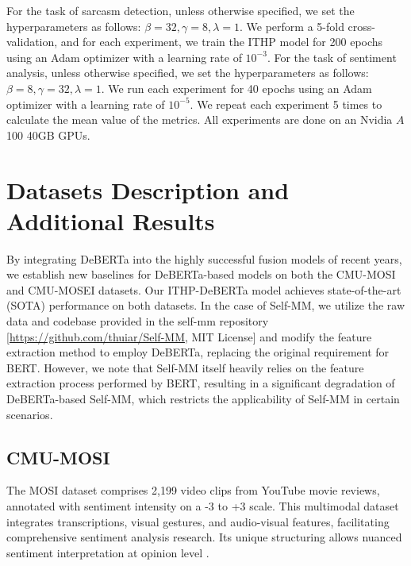 \documentclass{article} %
\begin{document}
For the task of sarcasm detection, unless otherwise specified, we set the  hyperparameters as follows: $\beta=32, \gamma=8, \lambda=1$. We perform a 5-fold cross-validation, and for each experiment, we train the ITHP model for 200 epochs using an Adam optimizer with a learning rate of $10^{-3}$. For the task of sentiment analysis, unless otherwise specified, we set the  hyperparameters as follows: $\beta=8, \gamma=32, \lambda=1$. We run each experiment for 40 epochs using an Adam optimizer with a learning rate of $10^{-5}$. We repeat each experiment 5 times to calculate the mean value of the metrics. All experiments are done on an Nvidia $A$100 40GB GPUs.


\section{Datasets Description and Additional Results}
\label{apsec:AdditionalRes}

By integrating DeBERTa into the highly successful fusion models of recent years, we establish new baselines for DeBERTa-based models on both the CMU-MOSI and CMU-MOSEI datasets. Our ITHP-DeBERTa model achieves state-of-the-art (SOTA) performance on both datasets. In the case of Self-MM, we utilize the raw data and codebase provided in the self-mm repository [\href{https://github.com/thuiar/Self-MM}{https://github.com/thuiar/Self-MM}, MIT License] and modify the feature extraction method to employ DeBERTa, replacing the original requirement for BERT. However, we note that Self-MM itself heavily relies on the feature extraction process performed by BERT, resulting in a significant degradation of DeBERTa-based Self-MM, which restricts the applicability of Self-MM in certain scenarios.



\subsection{CMU-MOSI}
\label{apsec: MOSI1}

The MOSI dataset comprises 2,199 video clips from YouTube movie reviews, annotated with sentiment intensity on a -3 to +3 scale. This multimodal dataset integrates transcriptions, visual gestures, and audio-visual features, facilitating comprehensive sentiment analysis research. Its unique structuring allows nuanced sentiment interpretation at opinion level \cite{gandhi2022multimodal}.
\end{document}

